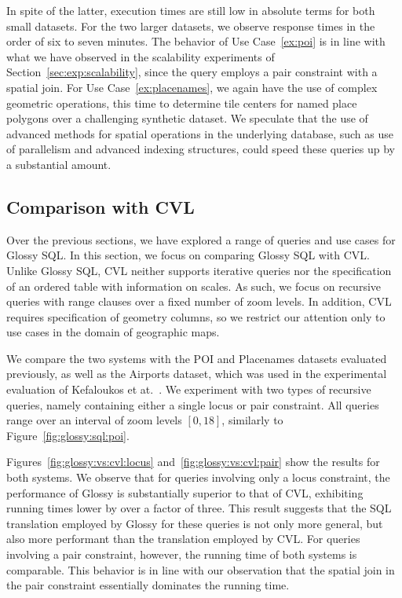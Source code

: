 \documentclass[11pt, oneside]{report}
\begin{document}
In spite of the latter, execution times are still low in absolute terms for both small datasets. For the two larger datasets, we observe response times in the order of six to seven minutes. The behavior of Use Case~\ref{ex:poi} is in line with what we have observed in the scalability experiments of Section~\ref{sec:exp:scalability}, since the query employs a pair constraint with a spatial join. For Use Case~\ref{ex:placenames}, we again have the use of complex geometric operations, this time to determine tile centers for named place polygons over a challenging synthetic dataset. We speculate that the use of advanced methods for spatial operations in the underlying database, such as use of parallelism and advanced indexing structures, could speed these queries up by a substantial amount. 

\subsection{Comparison with CVL}

Over the previous sections, we have explored a range of queries and use cases for Glossy SQL. In this section, we focus on comparing Glossy SQL with CVL. Unlike Glossy SQL, CVL neither supports iterative queries nor the specification of an ordered table with information on scales. As such, we focus on recursive queries with range clauses over a fixed number of zoom levels. In addition, CVL requires specification of geometry columns, so we restrict our attention only to use cases in the domain of geographic maps. 

We compare the two systems with the POI and Placenames datasets evaluated previously, as well as the Airports dataset, which was used in the experimental evaluation of Kefaloukos et at.~\cite{KefaloukosSZ14:CVL}. We experiment with two types of recursive queries, namely containing either a single locus or pair constraint. All queries range over an interval of zoom levels $[0,18]$, similarly to Figure~\ref{fig:glossy:sql:poi}. 

Figures~\ref{fig:glossy:vs:cvl:locus} and~\ref{fig:glossy:vs:cvl:pair} show the results for both systems. We observe that for queries involving only a locus constraint, the performance of Glossy is substantially superior to that of CVL, exhibiting running times lower by over a factor of three. This result suggests that the SQL translation employed by Glossy for these queries is not only more general, but also more performant than the translation employed by CVL. For queries involving a pair constraint, however, the running time of both systems is comparable. This behavior is in line with our observation that the spatial join in the pair constraint essentially dominates the running time.        
\end{document}
